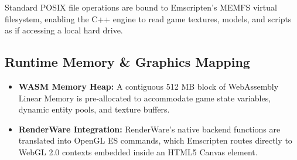 \documentclass[12pt,a4paper]{article}
\begin{document}
Standard POSIX file operations are bound to Emscripten's MEMFS virtual filesystem, enabling the C++ engine to read game textures, models, and scripts as if accessing a local hard drive.

\subsection{Runtime Memory \& Graphics Mapping}
\begin{itemize}
    \item \textbf{WASM Memory Heap:} A contiguous 512 MB block of WebAssembly Linear Memory is pre-allocated to accommodate game state variables, dynamic entity pools, and texture buffers.
    \item \textbf{RenderWare Integration:} RenderWare's native backend functions are translated into OpenGL ES commands, which Emscripten routes directly to WebGL 2.0 contexts embedded inside an HTML5 Canvas element.
\end{itemize}
\end{document}
